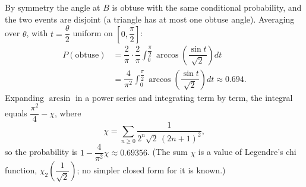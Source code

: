 By symmetry the angle at $B$ is obtuse with the same conditional probability, and the two events are disjoint (a triangle has at most one obtuse angle). Averaging over $\theta$, with $t=\dfrac\theta2$ uniform on $\left[0,\dfrac\pi2\right]$:
\begin{align*}
P(\text{obtuse})&=\dfrac{2}{\pi}\cdot\dfrac{2}{\pi}\int_0^{\dfrac\pi2}\arccos\left(\dfrac{\sin t}{\sqrt2}\right)dt\\
&=\boxed{\dfrac{4}{\pi^2}\int_0^{\dfrac\pi2}\arccos\left(\dfrac{\sin t}{\sqrt2}\right)dt\approx0.694}.
\end{align*}
Expanding $\arcsin$ in a power series and integrating term by term, the integral equals $\dfrac{\pi^2}{4}-\chi$, where
\[\chi=\sum_{n\ge0}\dfrac{1}{2^{n}\sqrt2\,(2n+1)^2},\]
so the probability is $1-\dfrac{4}{\pi^2}\chi\approx0.69356$. (The sum $\chi$ is a value of Legendre's chi function, $\chi_2\left(\dfrac{1}{\sqrt2}\right)$; no simpler closed form for it is known.)
